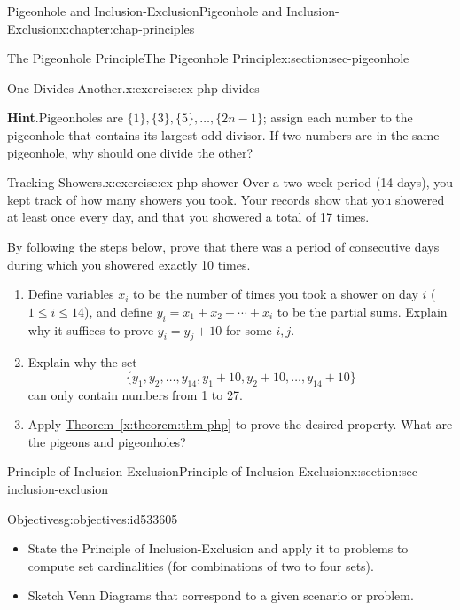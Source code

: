 \documentclass[oneside,10pt,]{book}
\newcommand{\blocktitlefont}{\relax}
\newcommand{\xreffont}{\relax}
\numberwithin{equation}{section}
\begin{document}
\begin{chapterptx}{Pigeonhole and Inclusion-Exclusion}{}{Pigeonhole and Inclusion-Exclusion}{}{}{x:chapter:chap-principles}
\begin{sectionptx}{The Pigeonhole Principle}{}{The Pigeonhole Principle}{}{}{x:section:sec-pigeonhole}
\begin{inlineexercise}{One Divides Another.}{x:exercise:ex-php-divides}
\par\smallskip%
\noindent\textbf{\blocktitlefont Hint}.\hypertarget{g:hint:id533523}{}\quad{}Pigeonholes are \(\{1\},\{3\},\{5\},\ldots,\{2n-1\}\); assign each number to the pigeonhole that contains its largest odd divisor. If two numbers are in the same pigeonhole, why should one divide the other?%
\end{inlineexercise}%
\begin{inlineexercise}{Tracking Showers.}{x:exercise:ex-php-shower}%
Over a two-week period (14 days), you kept track of how many showers you took. Your records show that you showered at least once every day, and that you showered a total of 17 times.%
\par
By following the steps below, prove that there was a period of consecutive days during which you showered exactly 10 times.%
\begin{enumerate}[label=(\alph*)]
\item{}Define variables \(x_i\) to be the number of times you took a shower on day \(i\) (\(1 \leq i \leq 14\)), and define \(y_i = x_1 + x_2 + \cdots + x_i\) to be the partial sums. Explain why it suffices to prove \(y_i = y_j + 10\) for some \(i,j\).%
\item{}Explain why the set%
\begin{equation*}
\{y_1,y_2,\ldots,y_{14},y_1+10,y_2+10,\ldots,y_{14}+10\}
\end{equation*}
can only contain numbers from 1 to 27.%
\item{}Apply \hyperref[x:theorem:thm-php]{Theorem~{\xreffont\ref{x:theorem:thm-php}}} to prove the desired property. What are the pigeons and pigeonholes?%
\end{enumerate}
%
\end{inlineexercise}%
\end{sectionptx}
%
%
\typeout{************************************************}
\typeout{************************************************}
%
\begin{sectionptx}{Principle of Inclusion-Exclusion}{}{Principle of Inclusion-Exclusion}{}{}{x:section:sec-inclusion-exclusion}
\begin{objectives}{Objectives}{g:objectives:id533605}
%
\begin{itemize}[label=\textbullet]
\item{}State the Principle of Inclusion-Exclusion and apply it to problems to compute set cardinalities (for combinations of two to four sets).%
\item{}Sketch Venn Diagrams that correspond to a given scenario or problem.%

\end{itemize}
\end{objectives}
\end{sectionptx}
\end{chapterptx}
\end{document}
